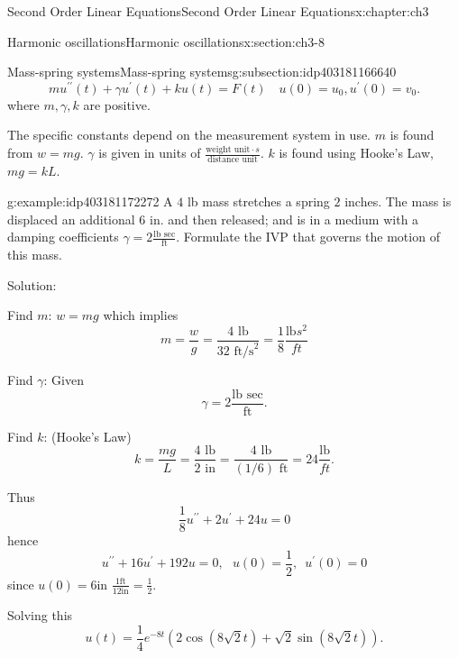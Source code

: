 \documentclass[oneside,10pt,]{book}
\numberwithin{equation}{section}
\numberwithin{equation}{section}
\begin{document}
\begin{chapterptx}{Second Order Linear Equations}{}{Second Order Linear Equations}{}{}{x:chapter:ch3}
\begin{sectionptx}{Harmonic oscillations}{}{Harmonic oscillations}{}{}{x:section:ch3-8}
\begin{subsectionptx}{Mass-spring systems}{}{Mass-spring systems}{}{}{g:subsection:idp403181166640}
\begin{equation*}
mu^{\prime\prime}(t)+\gamma u^{\prime}(t)+ku(t)=F(t)\,\,\,\,\,\,u(0)=u_{0},u^{\prime}(0)=v_{0}.
\end{equation*}
where \(m,\gamma,k\) are positive.%
\par
The specific constants depend on the measurement system in use. \(m\) is found from \(w=mg\). \(\gamma\) is given in units of \(\frac{\text{weight unit} \cdot s}{\text{distance unit}}\).  \(k\) is found using Hooke's Law, \(mg=kL\).%
\begin{example}{}{g:example:idp403181172272}%
A \(4\) lb mass stretches a spring \(2\) inches. The mass is displaced an additional 6 in. and then released; and is in a medium with a damping coefficients \(\gamma=2\frac{\text{lb sec}}{\text{ft}}\). Formulate the IVP that governs the motion of this mass.%
\par
Solution:%
\par
Find \(m\): \(w=mg\) which implies%
\begin{equation*}
m=\frac{w}{g}=\frac{4\text{ lb}}{32\text{ ft/s}^2}=\frac{1}{8}\frac{\text{lb}s^{2}}{ft}
\end{equation*}
%
\par
Find \(\gamma\): Given%
\begin{equation*}
\gamma=2\frac{\text{lb sec}}{\text{ft}}.
\end{equation*}
%
\par
Find \(k\): (Hooke's Law)%
\begin{equation*}
k=\frac{mg}{L}=\frac{4\text{ lb}}{2\text{ in}}=\frac{4\text{ lb}}{(1/6)\text{ ft}}=24\frac{\text{lb}}{ft}.
\end{equation*}
%
\par
Thus%
\begin{equation*}
\frac{1}{8}u^{\prime\prime}+2u^{\prime}+24u=0
\end{equation*}
hence%
\begin{equation*}
u^{\prime\prime}+16u^{\prime}+192u=0,\,\,\,\,u(0)=\frac{1}{2},\,\,\,u^{\prime}(0)=0
\end{equation*}
since \(u(0)=6\text{in }\frac{1\text{ft}}{12\text{in}}=\frac{1}{2}\).%
\par
Solving this%
\begin{equation*}
u(t)=\frac{1}{4}e^{-8t}\left(2\cos\left(8\sqrt{2}t\right)+\sqrt{2}\sin\left(8\sqrt{2}t\right)\right).
\end{equation*}
%
\begin{image}{0}{1}{0}%

\end{image}
\end{example}
\end{subsectionptx}
\end{sectionptx}
\end{chapterptx}
\end{document}
